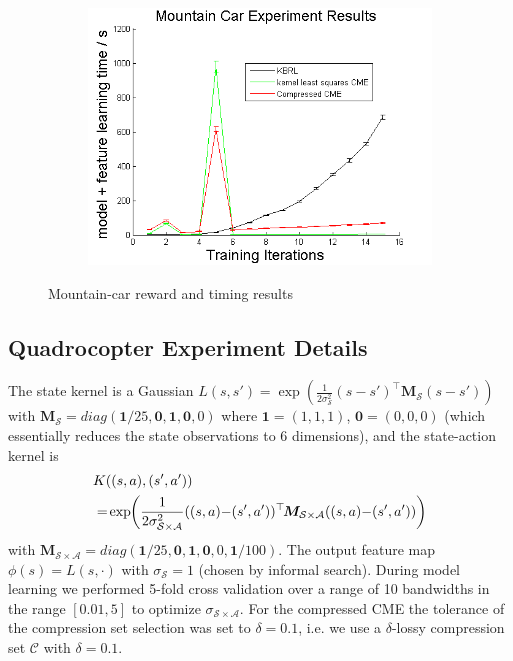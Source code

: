 \documentclass[letterpaper]{article}
\newcommand{\cC}{{\mathcal C}}
\newcommand{\cA}{{\mathcal A}}
\newcommand{\cS}{{\mathcal S}}
\newcommand{\bM}{{\bm M}}
\newcommand{\nn}{\nonumber}
\newcommand{\bzero}{{\bm 0}}
\newcommand{\bone}{{\bm 1}}
\begin{document}
\begin{figure}[htb]
\begin{subfigure}[b]{0.3\textwidth}
\includegraphics[width=\textwidth]{MCmodelfeature.png}
\end{subfigure}
\caption{Mountain-car reward and timing results}
  \label{MCfigs}
\end{figure}

\subsection{Quadrocopter Experiment Details}

The state kernel is a Gaussian $L(s,s') = \exp\left({\frac{1}{2\sigma_{\cS}^2}(s - s')^\top \bM_\cS (s - s')}\right)$ with $\bM_\cS =diag( \bone/25, \bzero ,\bone, \bzero ,0)$ where $\bone = (1,1,1)$, $\bzero = (0,0,0)$ (which essentially reduces the state observations to 6 dimensions), and the state-action kernel is
\begin{align}
&K((s,a),(s',a')) \nn\\
&= \hspace{-0.5mm}\exp\hspace{-0.8mm}\left({\frac{1}{2\sigma_{\cS\times\cA}^2}((s,a)\hspace{-0.8mm} - \hspace{-0.8mm}(s',a'))^\top \hspace{-0.5mm}\bM_{\cS\times\cA} ((s,a)\hspace{-0.8mm} -\hspace{-0.8mm} (s',a'))}\right)\nn
\end{align}
with $\bM_{\cS\times\cA} =diag(\bone /25,\bzero ,\bone,\bzero,0,  \bone/100)$. The output feature map $\phi(s) = L(s,\cdot)$ with $\sigma_{\cS} = 1$ (chosen by informal search). During model learning we performed 5-fold cross validation over a range of 10 bandwidths in the range $[0.01,5]$ to optimize $\sigma_{\cS\times\cA}$. For the compressed CME the tolerance of the compression set selection was set to $\delta = 0.1$, i.e. we use a $\delta$-lossy compression set $\cC$ with $\delta=0.1$.
\end{document}
